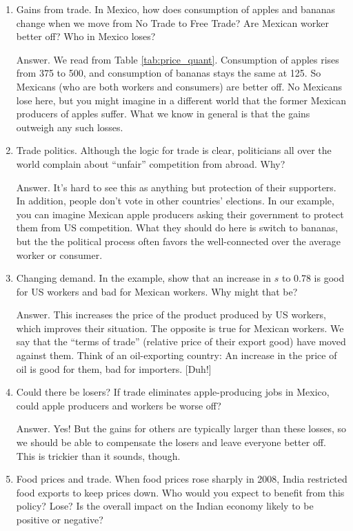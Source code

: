 \begin{enumerate}
\item Gains from trade. In Mexico, how does consumption
of apples and bananas change when we move from No Trade to Free Trade?
Are Mexican worker better off?
Who in Mexico loses?

Answer.  We read from Table \ref{tab:price_quant}.
Consumption of apples rises from 375 to 500,
and consumption of bananas stays the same at 125.
So Mexicans (who are both workers and consumers) are better off.
No Mexicans lose here, but you might imagine in a different world
that the former Mexican producers of apples suffer.
What we know in general is that the gains outweigh any such losses.

\item Trade politics.
Although the logic for trade is clear,
politicians all over the world complain about ``unfair'' competition
from abroad.
Why?

Answer.
It's hard to see this as anything but protection of their supporters.
In addition, people don't vote in other countries' elections.
In our example, you can imagine Mexican apple producers asking their
government to protect them from US competition.
What they should do here is switch to bananas, but the
the political process often favors the well-connected over the
average worker or consumer.


\item Changing demand.
In the example, show that an increase in $s$ to 0.78
is good for US workers and bad for Mexican workers.
Why might that be?

Answer.  This increases the price of the product produced by US workers,
which improves their situation.  The opposite is true for Mexican workers.
We say that the ``terms of trade'' (relative price of their export good) have moved against them.
Think of an oil-exporting country:  An increase in the price of oil
is good for them, bad for importers.  [Duh!]

\item Could there be losers?
If trade eliminates apple-producing jobs in Mexico,
could apple producers and workers be worse off?

Answer.  Yes!  But the gains for others are typically
larger than these losses,
so we should be able to compensate the losers and leave
everyone better off.
This is trickier than it sounds, though.

\item Food prices and trade.
When food prices rose sharply in 2008, India restricted
food exports to keep prices down.
Who would you expect to benefit from this policy?  Lose?
Is the overall impact on the Indian economy likely to be
positive or negative?


\end{enumerate}
